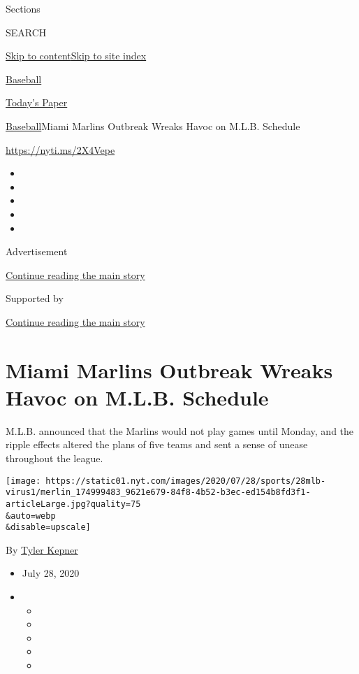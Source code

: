 Sections

SEARCH

\protect\hyperlink{site-content}{Skip to
content}\protect\hyperlink{site-index}{Skip to site index}

\href{https://www.nytimes.com/section/sports/baseball}{Baseball}

\href{https://myaccount.nytimes.com/auth/login?response_type=cookie\&client_id=vi}{}

\href{https://www.nytimes.com/section/todayspaper}{Today's Paper}

\href{/section/sports/baseball}{Baseball}\textbar{}Miami Marlins
Outbreak Wreaks Havoc on M.L.B. Schedule

\url{https://nyti.ms/2X4Vepe}

\begin{itemize}
\item
\item
\item
\item
\item
\end{itemize}

Advertisement

\protect\hyperlink{after-top}{Continue reading the main story}

Supported by

\protect\hyperlink{after-sponsor}{Continue reading the main story}

\hypertarget{miami-marlins-outbreak-wreaks-havoc-on-mlb-schedule}{%
\section{Miami Marlins Outbreak Wreaks Havoc on M.L.B.
Schedule}\label{miami-marlins-outbreak-wreaks-havoc-on-mlb-schedule}}

M.L.B. announced that the Marlins would not play games until Monday, and
the ripple effects altered the plans of five teams and sent a sense of
unease throughout the league.

\texttt{[image: https://static01.nyt.com/images/2020/07/28/sports/28mlb-virus1/merlin\_174999483\_9621e679-84f8-4b52-b3ec-ed154b8fd3f1-articleLarge.jpg?quality=75\\\&auto=webp\\\&disable=upscale]}

By \href{https://www.nytimes.com/by/tyler-kepner}{Tyler Kepner}

\begin{itemize}
\item
  July 28, 2020
\item
  \begin{itemize}
  \item
  \item
  \item
  \item
  \item
  \end{itemize}
\end{itemize}

